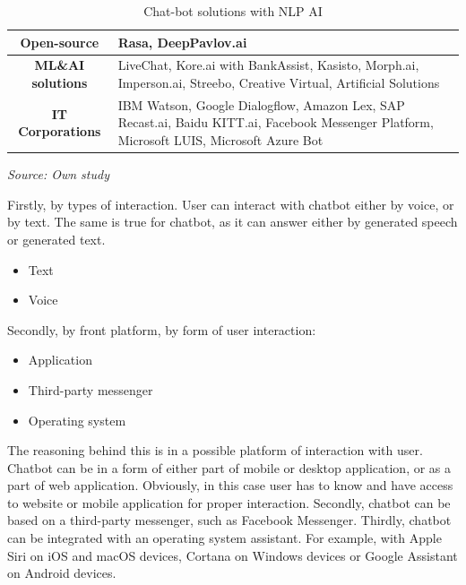\begin{table}
    \centering
    \begin{tabular}{|c|p{10cm}|}
        \hline
        \textbf{Open-source} & Rasa, DeepPavlov.ai \\
        \hline
        \textbf{ML\&AI solutions} & LiveChat, Kore.ai with BankAssist, Kasisto, \newline Morph.ai, Imperson.ai, Streebo, \newline Creative Virtual, Artificial Solutions \\
        \hline
        \textbf{IT Corporations} & IBM Watson, Google Dialogflow, Amazon Lex, \newline SAP Recast.ai, Baidu KITT.ai, \newline Facebook Messenger Platform, \newline Microsoft LUIS, Microsoft Azure Bot \\
        \hline
    \end{tabular}
    \caption{Chat-bot solutions with NLP AI}
    \medskip
    \footnotesize\textit{Source: Own study} 
\end{table}


Firstly, by types of interaction.
User can interact with chatbot either by voice, or by text.
The same is true for chatbot, as it can answer either by generated speech or generated text.
\begin{itemize}
    \item Text
    \item Voice 
\end{itemize}

Secondly, by front platform, by form of user interaction:
\begin{itemize}
    \item Application 
    \item Third-party messenger
    \item Operating system
\end{itemize}

The reasoning behind this is in a possible platform of interaction with user.
Chatbot can be in a form of either part of mobile or desktop application, or as a part of web application.
Obviously, in this case user has to know and have access to website or mobile application for proper interaction.
Secondly, chatbot can be based on a third-party messenger, such as Facebook Messenger.
Thirdly, chatbot can be integrated with an operating system assistant.
For example, with Apple Siri on iOS and macOS devices, Cortana on Windows devices or Google Assistant on Android devices.

